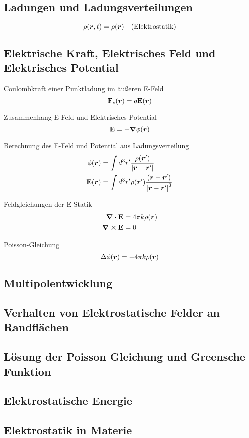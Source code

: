 \subsection{Ladungen und Ladungsverteilungen}%
\begin{equation*}
  \rho(\vb*r, t) = \rho(\vb*r) \quad (\text{Elektrostatik})
\end{equation*}

\subsection{Elektrische Kraft, Elektrisches Feld und Elektrisches Potential}%
\begin{multicols}{2}
\noindent
Coulombkraft einer Punktladung im äußeren E-Feld
\begin{equation*}
  \vb F_c(\vb*r) = q\vb E(\vb*r)
\end{equation*}

\noindent
Zusammenhang E-Feld und Elektrisches Potential
\begin{equation*}
  \vb E = -\grad\phi(\vb*r)
\end{equation*}

\noindent
Berechnung des E-Feld und Potential aus Ladungsverteilung 
\begin{equation*}
  \begin{split}
    \phi(\vb*r)&=\int d^3r' \frac{\rho(\vb*r')}{\abs{\vb*r-\vb*r'}}\\
    \vb E(\vb*r)&=\int d^3r' \rho(\vb*r')\frac{(\vb*r-\vb*r')}{\abs{\vb*r-\vb*r'}^3}\\
  \end{split}
\end{equation*}

\noindent
Feldgleichungen der E-Statik
\begin{equation*}
  \begin{split}
    \div\vb E &= 4\pi k \rho(\vb*r)\\ 
    \curl\vb E &= 0\\ 
  \end{split}
\end{equation*}

\noindent
Poisson-Gleichung
\begin{equation*}
  \Delta\phi(\vb*r) = -4\pi k \rho(\vb*r)
\end{equation*}
\end{multicols}

\subsection{Multipolentwicklung}%

\subsection{Verhalten von Elektrostatische Felder an Randflächen}%

\subsection{Lösung der Poisson Gleichung und Greensche Funktion}%

\subsection{Elektrostatische Energie}%

\subsection{Elektrostatik in Materie}%
